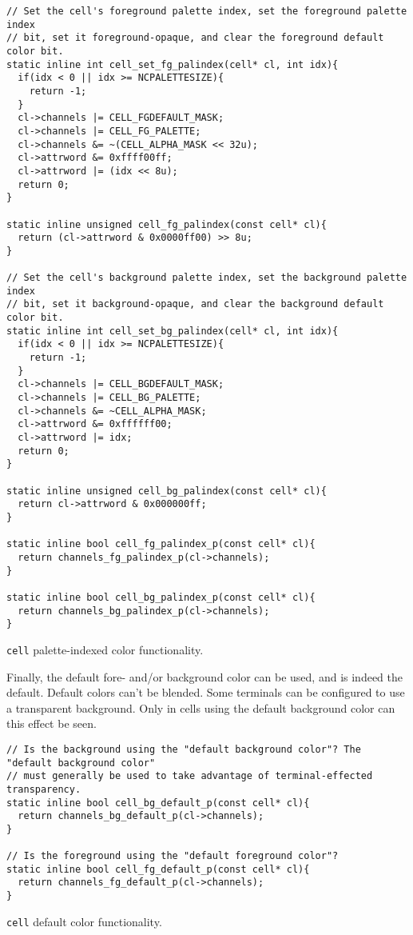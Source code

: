 \begin{listing}[!htb]
\begin{verbatim}
// Set the cell's foreground palette index, set the foreground palette index
// bit, set it foreground-opaque, and clear the foreground default color bit.
static inline int cell_set_fg_palindex(cell* cl, int idx){
  if(idx < 0 || idx >= NCPALETTESIZE){
    return -1;
  }
  cl->channels |= CELL_FGDEFAULT_MASK;
  cl->channels |= CELL_FG_PALETTE;
  cl->channels &= ~(CELL_ALPHA_MASK << 32u);
  cl->attrword &= 0xffff00ff;
  cl->attrword |= (idx << 8u);
  return 0;
}

static inline unsigned cell_fg_palindex(const cell* cl){
  return (cl->attrword & 0x0000ff00) >> 8u;
}

// Set the cell's background palette index, set the background palette index
// bit, set it background-opaque, and clear the background default color bit.
static inline int cell_set_bg_palindex(cell* cl, int idx){
  if(idx < 0 || idx >= NCPALETTESIZE){
    return -1;
  }
  cl->channels |= CELL_BGDEFAULT_MASK;
  cl->channels |= CELL_BG_PALETTE;
  cl->channels &= ~CELL_ALPHA_MASK;
  cl->attrword &= 0xffffff00;
  cl->attrword |= idx;
  return 0;
}

static inline unsigned cell_bg_palindex(const cell* cl){
  return cl->attrword & 0x000000ff;
}

static inline bool cell_fg_palindex_p(const cell* cl){
  return channels_fg_palindex_p(cl->channels);
}

static inline bool cell_bg_palindex_p(const cell* cl){
  return channels_bg_palindex_p(cl->channels);
}
\end{verbatim}
\caption{\texttt{cell} palette-indexed color functionality.}
\label{listing:cellpalette}
\end{listing}

Finally, the default fore- and/or background color can be used, and is indeed
the default. Default colors can't be blended. Some terminals can be configured
to use a transparent background. Only in cells using the default background
color can this effect be seen.

\begin{listing}[!htb]
\begin{verbatim}
// Is the background using the "default background color"? The "default background color"
// must generally be used to take advantage of terminal-effected transparency.
static inline bool cell_bg_default_p(const cell* cl){
  return channels_bg_default_p(cl->channels);
}

// Is the foreground using the "default foreground color"?
static inline bool cell_fg_default_p(const cell* cl){
  return channels_fg_default_p(cl->channels);
}
\end{verbatim}
\caption{\texttt{cell} default color functionality.}
\end{listing}

